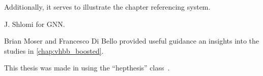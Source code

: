 



Additionally, it serves to illustrate the chapter referencing system.

J. Shlomi for GNN.

Brian Moser and Francesco Di Bello provided useful guidance an insights into the studies in \cref{chap:vhbb_boosted}.

This thesis was made in \LaTeXe{} using the ``hepthesis'' class~\cite{Buckley:2010:hepthesis}.


